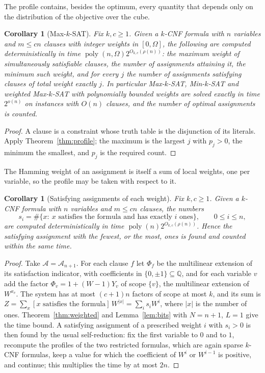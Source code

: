 \documentclass[11pt,reqno]{amsart}
\numberwithin{equation}{section}
\theoremstyle{plain}
\newtheorem{corollary}[theorem]{Corollary}
\theoremstyle{definition}
\theoremstyle{remark}
\DeclareMathOperator{\poly}{poly}
\newcommand{\A}{\mathcal{A}}
\newcommand{\Q}{\mathbb{Q}}
\newcommand{\rhon}{\rho}
\begin{document}
The profile contains, besides the optimum, every quantity that depends only on
the distribution of the objective over the cube.

\begin{corollary}[Max-$k$-SAT]\label{cor:maxsat}
Fix $k,c\ge1$. Given a $k$-CNF formula with $n$ variables and $m\le cn$ clauses
with integer weights in $[0,\Omega]$, the following are computed deterministically
in time $\poly(n,\Omega)2^{O_{k,c}(\rhon(n))}$: the maximum weight of
simultaneously satisfiable clauses, the number of assignments attaining it, the
minimum such weight, and for every $j$ the number of assignments satisfying
clauses of total weight exactly $j$. In particular Max-$k$-SAT, Min-$k$-SAT and
weighted Max-$k$-SAT with polynomially bounded weights are solved exactly in time
$2^{o(n)}$ on instances with $O(n)$ clauses, and the number of optimal
assignments is counted.
\end{corollary}

\begin{proof}
A clause is a constraint whose truth table is the disjunction of its literals.
Apply Theorem~\ref{thm:profile}; the maximum is the largest $j$ with $p_j>0$,
the minimum the smallest, and $p_j$ is the required count.
\end{proof}

The Hamming weight of an assignment is itself a sum of local weights, one per
variable, so the profile may be taken with respect to it.

\begin{corollary}[Satisfying assignments of each weight]\label{cor:hamming}
Fix $k,c\ge1$. Given a $k$-CNF formula with $n$ variables and $m\le cn$ clauses,
the numbers
\[
  s_i=\#\{x:\ x\text{ satisfies the formula and has exactly $i$ ones}\},\qquad 0\le i\le n,
\]
are computed deterministically in time $\poly(n)2^{O_{k,c}(\rhon(n))}$. Hence the
satisfying assignment with the fewest, or the most, ones is found and counted
within the same time.
\end{corollary}

\begin{proof}
Take $\A=\A_{n+1}$. For each clause $f$ let $\Phi_f$ be the multilinear extension
of its satisfaction indicator, with coefficients in $\{0,\pm1\}\subseteq\Q$, and
for each variable $v$ add the factor $\Phi_v=1+(W-1)Y_v$ of scope $\{v\}$,
the multilinear extension of $W^{x_v}$. The system has at most $(c+1)n$ factors
of scope at most $k$, and its sum is
$Z=\sum_x[\text{$x$ satisfies the formula}]\,W^{|x|}=\sum_is_iW^i$, where $|x|$
is the number of ones. Theorem~\ref{thm:weighted} and Lemma~\ref{lem:bits}
with $N=n+1$, $L=1$ give the time bound. A satisfying assignment of a prescribed
weight $i$ with $s_i>0$ is then found by the usual self-reduction: fix the first
variable to $0$ and to $1$, recompute the profiles of the two restricted
formulas, which are again sparse $k$-CNF formulas, keep a value for which the
coefficient of $W^{i}$ or $W^{i-1}$ is positive, and continue; this multiplies
the time by at most $2n$.
\end{proof}
\end{document}
